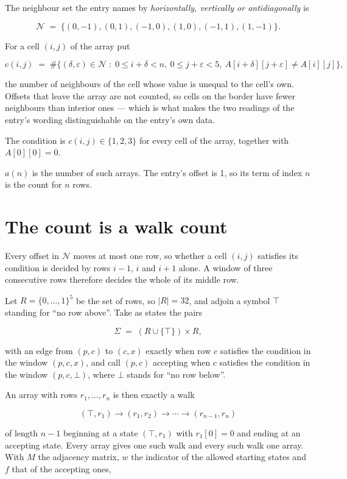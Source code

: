 \documentclass[11pt]{article}
\theoremstyle{definition}
\begin{document}
The neighbour set the entry names by {\itshape horizontally, vertically or antidiagonally} is

\[\mathcal{N} \;=\; \{(0,-1), (0,1), (-1,0), (1,0), (-1,1), (1,-1)\}.\]

For a cell $(i,j)$ of the array put

\[c(i,j) \;=\; \#\bigl\{(\delta,\varepsilon)\in\mathcal{N} \;:\; 0\le i+\delta<n,\ 0\le j+\varepsilon<5,\ A[i+\delta][j+\varepsilon] \neq A[i][j]\bigr\},\]

the number of neighbours of the cell whose value is unequal to the cell's own. Offsets that leave the array are not counted, so cells on the border have fewer neighbours than interior ones --- which is what makes the two readings of the entry's wording distinguishable on the entry's own data.

The condition is $c(i,j) \in \{1, 2, 3\}$ for every cell of the array, together with $A[0][0]=0$.

$a(n)$ is the number of such arrays. The entry's offset is 1, so its term of index $n$ is the count for $n$ rows.

\section{The count is a walk count}

Every offset in $\mathcal{N}$ moves at most one row, so whether a cell $(i,j)$ satisfies its condition is decided by rows $i-1$, $i$ and $i+1$ alone. A window of three consecutive rows therefore decides the whole of its middle row.

Let $R = \{0,\dots,1\}^{5}$ be the set of rows, so $|R| = 32$, and adjoin a symbol $\top$ standing for ``no row above''. Take as states the pairs

\[\Sigma \;=\; (R \cup \{\top\}) \times R,\]

with an edge from $(p,c)$ to $(c,x)$ exactly when row $c$ satisfies the condition in the window $(p,c,x)$, and call $(p,c)$ accepting when $c$ satisfies the condition in the window $(p,c,\bot)$, where $\bot$ stands for ``no row below''.

An array with rows $r_1,\dots,r_n$ is then exactly a walk

\[(\top,r_1) \to (r_1,r_2) \to \cdots \to (r_{n-1},r_n)\]

of length $n-1$ beginning at a state $(\top,r_1)$ with $r_1[0]=0$ and ending at an accepting state. Every array gives one such walk and every such walk one array. With $M$ the adjacency matrix, $w$ the indicator of the allowed starting states and $f$ that of the accepting ones,
\end{document}
